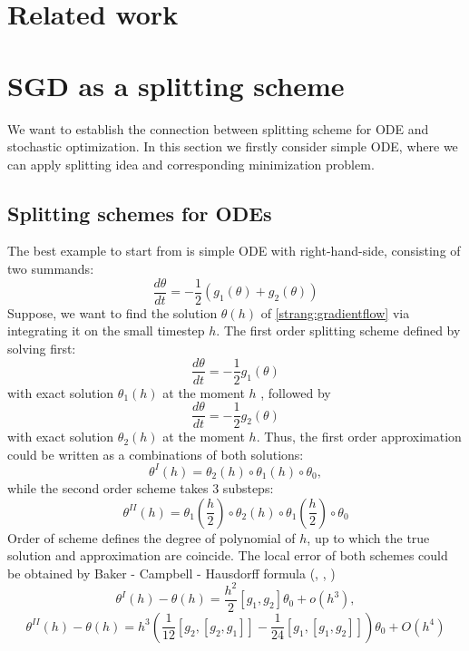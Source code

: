 \documentclass{article} %
\begin{document}
\section{Related work}




\section{SGD as a splitting scheme}

We want to establish the connection between splitting scheme for ODE and stochastic optimization. In this section we firstly consider simple ODE, where we can apply splitting idea and corresponding minimization problem.

\subsection{Splitting schemes for ODEs}
The best example to start from is simple ODE with right-hand-side, consisting of two summands:
\begin{equation}
    \dfrac{d \theta}{d t} = - \frac{1}{2} \left( g_1(\theta) + g_2(\theta)\right)
    \label{strang:gradientflow}
\end{equation}
Suppose, we want to find the solution $\theta(h)$ of \eqref{strang:gradientflow} via integrating it on the small timestep $h$. The first order splitting scheme defined by solving first:
$$
\dfrac{d \theta}{d t} = - \frac{1}{2} g_1(\theta)
$$
with exact solution $\theta_1(h)$ at the moment $h$ , followed by
$$
\dfrac{d \theta}{d t} = - \frac{1}{2} g_2(\theta)
$$
with exact solution $\theta_2(h)$ at the moment $h$. Thus, the first order approximation could be written as a combinations of both solutions:
$$
\theta^I(h) = \theta_2(h) \circ \theta_1(h) \circ \theta_0,
$$
while the second order scheme takes 3 substeps:
$$
\theta^{II}(h) = \theta_1\left(\frac{h}{2}\right) \circ \theta_2(h) \circ \theta_1\left(\frac{h}{2}\right) \circ \theta_0
$$
Order of scheme defines the degree of polynomial of $h$, up to which the true solution and approximation are coincide. The local error of both schemes could be obtained by Baker - Campbell - Hausdorff formula (\cite{baker1901further}, \cite{campbell1896law}, \cite{hausdorff1906symbolische})
\begin{equation}
    \label{strang:lie_error}
    \theta^I(h) - \theta(h) = \dfrac{h^2}{2} \left[g_{1}, g_{2}\right] \theta_0 + o(h^3),
\end{equation}
\begin{equation}
    \label{strang:marchuk_error}
    \theta^{II}(h) - \theta(h) = h^{3} \left(\frac{1}{12}[g_2,[g_2, g_1]]-\frac{1}{24}[g_1,[g_1, g_2]]\right)\theta_0+O\left(h^{4}\right)
\end{equation}
\end{document}
